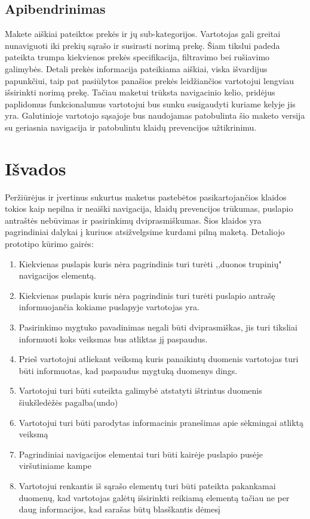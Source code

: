 \documentclass[oneside]{VUMIFPSkursinis}
\begin{document}
\pagebreak
	\subsection{Apibendrinimas}
Makete aiškiai pateiktos prekės ir jų sub-kategorijos. Vartotojas gali greitai nunaviguoti iki prekių sąrašo ir susirasti norimą prekę. Šiam tikslui padeda pateikta trumpa kiekvienos prekės specifikacija, filtravimo bei rušiavimo galimybės. Detali prekės informacija pateikiama aiškiai, viska išvardijus papunkčiui, taip pat pasiūlytos panašios prekės leidžiančios vartotojui lengviau išsirinkti norimą prekę. Tačiau maketui trūksta navigacinio kelio, pridėjus paplidomus funkcionalumus vartotojui bus sunku susigaudyti kuriame kelyje jis yra. Galutinioje vartotojo sąsajoje bus naudojamas patobulinta šio maketo versija su geriasnia navigacija ir patobulintu klaidų prevencijos užtikrinimu.

\iffalse XXXXXXXXXXXXXXXXXXXXXXXXXXXXXXXXXXXXXXXXXXXXXXXXXXXXXXXXXXXXXXXXXXXXXXXXXXXXXXXXXXXXXXXXXXXXXXXXXXXXXXXXXXXXXXXXXXXXXXXXXXXXXXXXXXXXXXX \fi
\section{Išvados}
Peržiūrėjus ir įvertinus sukurtus maketus pastebėtos pasikartojančios klaidos tokios kaip nepilna ir neaiški navigacija, klaidų prevencijos trūkumas, puslapio antraštės nebūvimas ir pasirinkimų dviprasmiškumas. Šios klaidos yra pagrindiniai dalykai į kuriuos atsižvelgsime kurdami pilną maketą.
\linebreak
\linebreak
Detaliojo prototipo kūrimo gairės:
\begin{enumerate}
	\item{Kiekvienas puslapis kuris nėra pagrindinis turi turėti ,,duonos trupinių" navigacijos elementą.}
	\item{Kiekvienas puslapis kuris nėra pagrindinis turi turėti puslapio antrašę informuojančia kokiame puslapyje vartotojas yra.}
	\item{Pasirinkimo mygtuko pavadinimas negali būti dviprasmiškas, jis turi tiksliai informuoti koks veiksmas bus atliktas jį paspaudus.}
	\item{Prieš vartotojui atliekant veiksmą kuris panaikintų duomenis vartotojas turi būti informuotas, kad paspaudus mygtuką duomenys dings.}
	\item{Vartotojui turi būti suteikta galimybė atstatyti ištrintus duomenis šiukšledėžės pagalba(undo)}
	\item{Vartotojui turi būti parodytas informacinis pranešimas apie sėkmingai atliktą veiksmą}
	\item{Pagrindiniai navigacijos elementai turi būti kairėje puslapio pusėje viršutiniame kampe}
	\item{Vartotojui renkantis iš sąrašo elementų turi būti pateikta pakankamai duomenų, kad vartotojas galėtų išsirinkti reikiamą elementą tačiau ne per daug informacijos, kad sarašas būtų blasškantis dėmesį}
\end{enumerate}
\end{document}
